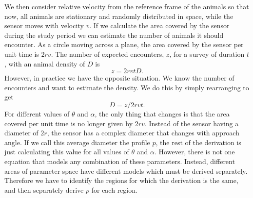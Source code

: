 \documentclass[a4paper,10pt,reqno,oneside]{amsart}
\begin{document}
We then consider relative velocity from the reference frame of the animals so that now, all animals are stationary and randomly distributed in space, while the sensor moves with velocity $v$. If we calculate the area covered by the sensor during the study period we can estimate the number of animals it should encounter. As a circle moving across a plane, the area covered by the sensor per unit time is $2rv$. The number of expected encounters, $z$, for a survey of duration $t$, with an animal density of $D$ is
\begin{equation}
	z = 2rvtD.
\end{equation}
However, in practice we have the opposite situation. We know the number of encounters and want to estimate the density. We do this by simply rearranging to get
\begin{equation}
	D = z/2rvt.
\end{equation}
For different values of $\theta$ and $\alpha$, the only thing that changes is that the area covered per unit time is no longer given by $2rv$. Instead of the sensor having a diameter of $2r$, the sensor has a complex diameter that changes with approach angle. If we call this average diameter the profile $p$, the rest of the derivation is just calculating this value for all values of $\theta$ and $\alpha$. However, there is not one equation that models any combination of these parameters. Instead, different areas of parameter space have different models which must be derived separately. Therefore we have to identify the regions for which the derivation is the same, and then separately derive $p$ for each region. 
\end{document}
